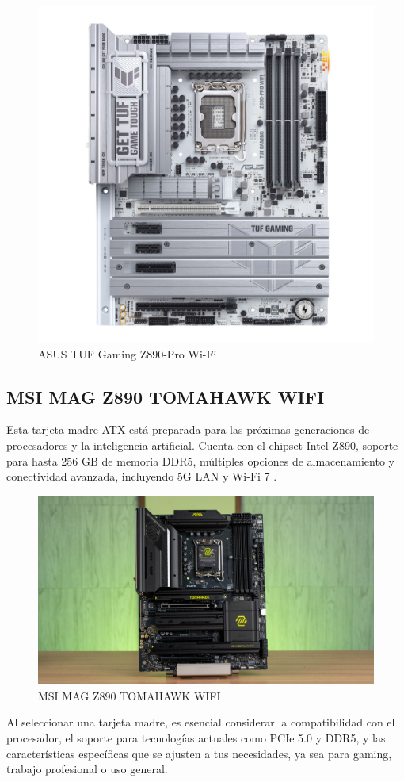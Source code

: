 \begin{figure}[H]
  \centering
  \includegraphics[scale=0.2]{imagenes/asusz890.png}
  \caption{ASUS TUF Gaming Z890-Pro Wi-Fi}
\end{figure}

\subsection{MSI MAG Z890 TOMAHAWK WIFI}

Esta tarjeta madre ATX está preparada para las próximas generaciones de procesadores y la inteligencia artificial. Cuenta con el chipset Intel Z890, soporte para hasta 256 GB de memoria DDR5, múltiples opciones de almacenamiento y conectividad avanzada, incluyendo 5G LAN y Wi-Fi 7 \cite{msiz890tomahawk}.

\begin{figure}[H]
  \centering
  \includegraphics[scale=0.1]{imagenes/z890tomahawk.png}
  \caption{MSI MAG Z890 TOMAHAWK WIFI}
\end{figure}

Al seleccionar una tarjeta madre, es esencial considerar la compatibilidad con el procesador, el soporte para tecnologías actuales como PCIe 5.0 y DDR5, y las características específicas que se ajusten a tus necesidades, ya sea para gaming, trabajo profesional o uso general.

